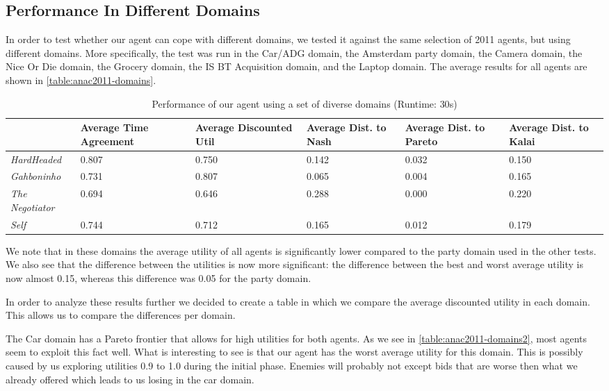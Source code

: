 \subsection{Performance In Different Domains}
In order to test whether our agent can cope with different domains, we tested it against the same selection of 2011 agents, but using different domains. More specifically, the test was run in the Car/ADG domain, the Amsterdam party domain, the Camera domain, the Nice Or Die domain, the Grocery domain, the IS BT Acquisition  domain, and the Laptop domain. The average results for all agents are shown in \autoref{table:anac2011-domains}.
\begin{table}[H]
  \centering
  \small
  \begin{tabular}{l|p{2cm}|p{2cm}|p{2cm}|p{2cm}|p{2cm}|}
    ~                     & Average Time Agreement & Average Discounted Util & Average Dist. to Nash & Average Dist. to Pareto & Average Dist. to Kalai \\
    \hline
    \emph{HardHeaded}     & 0.807 & 0.750 & 0.142 & 0.032 & 0.150 \\ \hline
    \emph{Gahboninho}     & 0.731 & 0.807 & 0.065 & 0.004 & 0.165 \\ \hline
    \emph{The Negotiator} & 0.694 & 0.646 & 0.288 & 0.000 & 0.220 \\ \hline
    \emph{Self}           & 0.744 & 0.712 & 0.165 & 0.012 & 0.179 \\ \hline
  \end{tabular}
 \caption{Performance of our agent using a set of diverse domains (Runtime: $30$s) \label{table:anac2011-domains}}
\end{table}
We note that in these domains the average utility of all agents is significantly lower compared to the party domain used in the other tests. We also see that the difference between the utilities is now more significant: the difference between the best and worst average utility is now almost 0.15, whereas this difference was 0.05 for the party domain. 

In order to analyze these results further we decided to create a table in which we compare the average discounted utility in each domain. This allows us to compare the differences per domain. 

The Car domain has a Pareto frontier that allows for high utilities for both agents. As we see in \autoref{table:anac2011-domains2}, most agents seem to exploit this fact well. What is interesting to see is that our agent has the worst average utility for this domain. This is possibly caused by us exploring utilities 0.9 to 1.0 during the initial phase. Enemies will probably not except bids that are worse then what we already offered which leads to us losing in the car domain.

